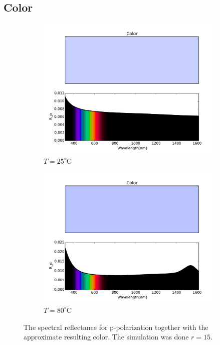 \subsection{Color} \label{sec:color}
%
\begin{figure} [h!]
    \centering
    \begin{subfigure}[b]{0.49\textwidth}
        \centering
        \includegraphics[width=\textwidth]{Results/Sim3/Rp_color25C.pdf}
        \caption{$T = 25^{\circ}$C}
        \label{fig:RpColor25C}
    \end{subfigure}
    \begin{subfigure}[b]{0.49\textwidth}
        \centering
        \includegraphics[width=\textwidth]{Results/Sim3/Rp_color80C.pdf}
        \caption{$T = 80^{\circ}$C}
        \label{fig:RpColor80C}
    \end{subfigure}
    \caption{
       The spectral reflectance for p-polarization together with the approximate resulting color.
       The simulation was done $r = 15$.
    }
    \label{fig:RpColor}
\end{figure}

